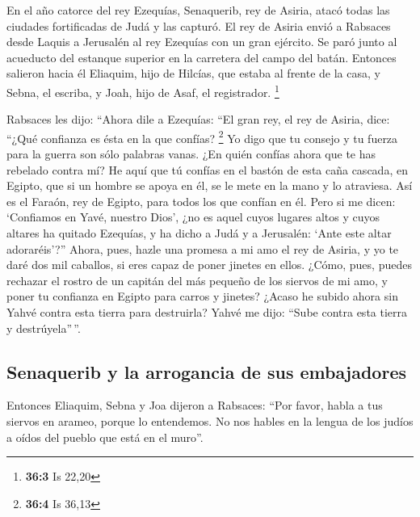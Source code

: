 \begin{paracol}{2}
 En el año catorce del rey Ezequías, Senaquerib, rey de
Asiria, atacó todas las ciudades fortificadas de Judá y las capturó.
 El rey de Asiria envió a Rabsaces desde Laquis a
Jerusalén al rey Ezequías con un gran ejército. Se paró junto al
acueducto del estanque superior en la carretera del campo del batán.
 Entonces salieron hacia él Eliaquim, hijo de Hilcías, que
estaba al frente de la casa, y Sebna, el escriba, y Joah, hijo de Asaf,
el registrador. \footnote{\textbf{36:3} Is 22,20}

 Rabsaces les dijo: ``Ahora dile a Ezequías: ``El gran
rey, el rey de Asiria, dice: ``¿Qué confianza es ésta en la que confías?
\footnote{\textbf{36:4} Is 36,13}  Yo digo que tu consejo
y tu fuerza para la guerra son sólo palabras vanas. ¿En quién confías
ahora que te has rebelado contra mí?  He aquí que tú
confías en el bastón de esta caña cascada, en Egipto, que si un hombre
se apoya en él, se le mete en la mano y lo atraviesa. Así es el Faraón,
rey de Egipto, para todos los que confían en él.  Pero si
me dicen: `Confiamos en Yavé, nuestro Dios', ¿no es aquel cuyos lugares
altos y cuyos altares ha quitado Ezequías, y ha dicho a Judá y a
Jerusalén: `Ante este altar adoraréis'?''  Ahora, pues,
hazle una promesa a mi amo el rey de Asiria, y yo te daré dos mil
caballos, si eres capaz de poner jinetes en ellos.  ¿Cómo,
pues, puedes rechazar el rostro de un capitán del más pequeño de los
siervos de mi amo, y poner tu confianza en Egipto para carros y jinetes?
 ¿Acaso he subido ahora sin Yahvé contra esta tierra para
destruirla? Yahvé me dijo: ``Sube contra esta tierra y destrúyela''\,''.

\hypertarget{senaquerib-y-la-arrogancia-de-sus-embajadores}{%
\subsection{Senaquerib y la arrogancia de sus
embajadores}\label{senaquerib-y-la-arrogancia-de-sus-embajadores}}

 Entonces Eliaquim, Sebna y Joa dijeron a Rabsaces: ``Por
favor, habla a tus siervos en arameo, porque lo entendemos. No nos
hables en la lengua de los judíos a oídos del pueblo que está en el
muro''.


\end{paracol}
